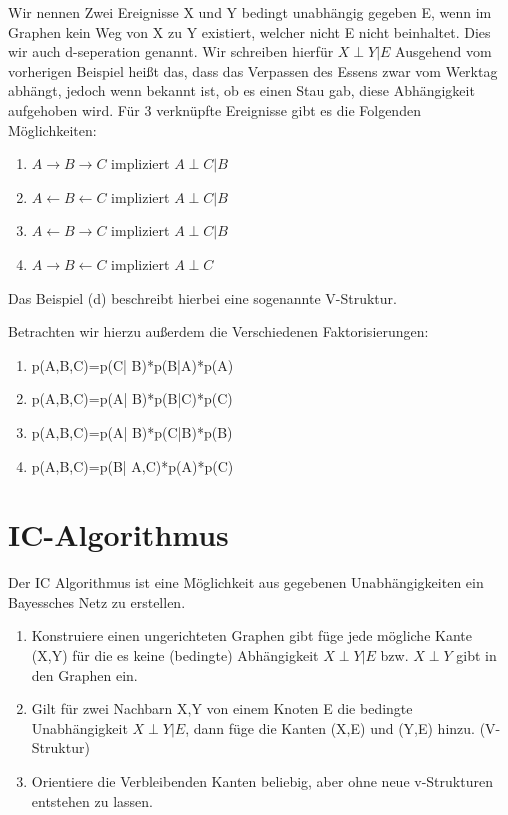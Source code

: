 Wir nennen Zwei Ereignisse X und Y bedingt unabhängig gegeben E, wenn im Graphen kein Weg von X zu Y existiert, welcher nicht E nicht beinhaltet.
Dies wir auch d-seperation genannt.
Wir schreiben hierfür
$X \perp Y | E$
Ausgehend vom vorherigen Beispiel heißt das, dass das Verpassen des Essens zwar vom Werktag abhängt, jedoch wenn bekannt ist, ob es einen Stau gab, diese Abhängigkeit aufgehoben wird.
Für 3 verknüpfte Ereignisse gibt es die Folgenden Möglichkeiten:
\begin{enumerate}[label=(\alph*)]
\item $A \rightarrow B \rightarrow C$ impliziert $A \perp C | B$
\item $A \leftarrow B \leftarrow C$ impliziert $A \perp C | B$
\item $A \leftarrow B \rightarrow C$ impliziert $A \perp C | B$
\item $A \rightarrow B \leftarrow C$ impliziert $A \perp C$
\end{enumerate}
Das Beispiel (d) beschreibt hierbei eine sogenannte V-Struktur.

Betrachten wir hierzu außerdem die Verschiedenen Faktorisierungen:
\begin{enumerate}[label=(\alph*)]
\item p(A,B,C)=p(C| B)*p(B|A)*p(A)
\item p(A,B,C)=p(A| B)*p(B|C)*p(C)
\item p(A,B,C)=p(A| B)*p(C|B)*p(B)
\item p(A,B,C)=p(B| A,C)*p(A)*p(C)
\end{enumerate}

\section{IC-Algorithmus}
Der IC Algorithmus ist eine Möglichkeit aus gegebenen Unabhängigkeiten ein Bayessches Netz zu erstellen.
\begin{enumerate}
\item Konstruiere einen ungerichteten Graphen gibt füge jede mögliche Kante (X,Y) für die es keine (bedingte) Abhängigkeit $X \perp Y | E$ bzw. $X \perp Y$ gibt in den Graphen ein.
\item Gilt für zwei Nachbarn X,Y von einem Knoten E die bedingte Unabhängigkeit $X \perp Y | E$, dann füge die Kanten (X,E) und (Y,E) hinzu. (V-Struktur)
\item Orientiere die Verbleibenden Kanten beliebig, aber ohne neue v-Strukturen entstehen zu lassen.
\end{enumerate}

